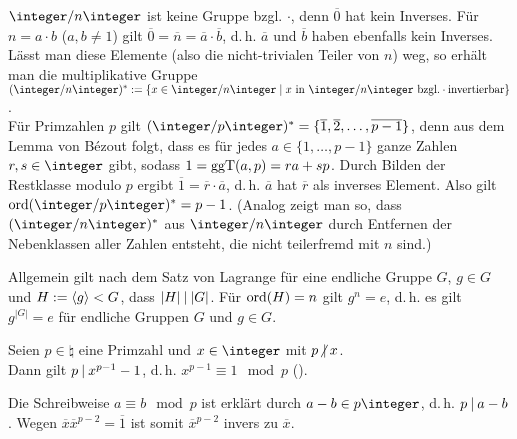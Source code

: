 \begin{Bem}
    $\integer/n\integer$ ist keine Gruppe bzgl. $\cdot$, denn
    $\overline{0}$ hat kein Inverses.
    Für $n = a \cdot b$ ($a, b \not= 1$) gilt
    $\overline{0} = \overline{n} = \overline{a} \cdot \overline{b}$, d.\,h.
    $\overline{a}$ und $\overline{b}$ haben ebenfalls kein Inverses.
    Lässt man diese Elemente (also die nicht-trivialen Teiler von $n$) weg,
    so erhält man die multiplikative Gruppe\\
    $(\integer/n\integer)^\ast := \{x \in \integer/n\integer \;|\;
    x \text{ in } \integer/n\integer \text{ bzgl.} \cdot
    \text{invertierbar}\}$.\\
    Für Primzahlen $p$ gilt $(\integer/p\integer)^\ast =
    \{\overline{1}, \overline{2}, \dotsc, \overline{p - 1}\}$,
    denn aus dem Lemma von Bézout folgt, dass es für jedes
    $a \in \{1, \dotsc, p - 1\}$ ganze Zahlen $r, s \in \integer$ gibt,
    sodass $1 = \operatorname{ggT}(a, p) = ra + sp$.
    Durch Bilden der Restklasse modulo $p$ ergibt
    $\overline{1} = \overline{r} \cdot \overline{a}$,
    d.\,h. $\overline{a}$ hat $\overline{r}$ als inverses Element.
    Also gilt $\ord(\integer/p\integer)^\ast = p - 1$.
    (Analog zeigt man so, dass $(\integer/n\integer)^\ast$ aus
    $\integer/n\integer$ durch Entfernen der Nebenklassen aller Zahlen
    entsteht, die nicht teilerfremd mit $n$ sind.)
\end{Bem}

\begin{Bem}
    Allgemein gilt nach dem Satz von Lagrange für eine endliche Gruppe $G$,
    $g \in G$ und $H := \left\langle g\right\rangle < G$, dass
    $|H| \mathbin{|} |G|$.
    Für $\operatorname{ord}(H) = n$ gilt $g^n = e$, d.\,h.
    es gilt $g^{|G|} = e$ für endliche Gruppen $G$ und $g \in G$.
\end{Bem}

\begin{Kor}
    Seien $p \in \natural$ eine Primzahl und
    $x \in \integer$ mit $p \mathbin{\!\not|} x$.\\
    Dann gilt $p \mathbin{|} x^{p-1} - 1$, d.\,h.
    $x^{p-1} \equiv 1 \mod p$
    ().
\end{Kor}

\begin{Bem}
    Die Schreibweise $a \equiv b \mod p$ ist erklärt durch
    $a - b \in p\integer$, d.\,h. $p \mathbin{|} a - b$.
    Wegen $\overline{x} \overline{x}^{p-2} = \overline{1}$ ist
    somit $\overline{x}^{p-2}$ invers zu $\overline{x}$.
\end{Bem}


